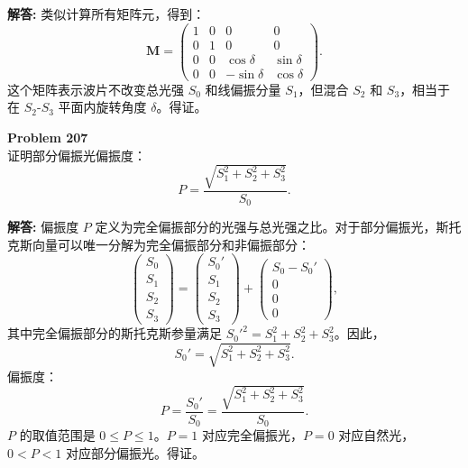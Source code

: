 \documentclass[12pt, a4paper, oneside]{ctexart}
\newenvironment{solution}{\par\noindent\textbf{解答:}\quad}{\par}
\begin{document}
\begin{solution}
    类似计算所有矩阵元，得到：
    \[
    \mathbf{M} = \begin{pmatrix}
        1 & 0 & 0 & 0 \\
        0 & 1 & 0 & 0 \\
        0 & 0 & \cos\delta & \sin\delta \\
        0 & 0 & -\sin\delta & \cos\delta
    \end{pmatrix}.
    \]
    这个矩阵表示波片不改变总光强 $S_0$ 和线偏振分量 $S_1$，但混合 $S_2$ 和 $S_3$，相当于在 $S_2$-$S_3$ 平面内旋转角度 $\delta$。得证。
\end{solution}

\begin{mdframed}[backgroundcolor=gray!10, linewidth=0pt]
    \textbf{Problem 207} \\
    证明部分偏振光偏振度：
    \[
    P = \frac{\sqrt{S_1^2+S_2^2+S_3^2}}{S_0}.
    \]
\end{mdframed}
\begin{solution}
    偏振度 $P$ 定义为完全偏振部分的光强与总光强之比。对于部分偏振光，斯托克斯向量可以唯一分解为完全偏振部分和非偏振部分：
    \[
    \begin{pmatrix} S_0 \\ S_1 \\ S_2 \\ S_3 \end{pmatrix} = \begin{pmatrix} S_0' \\ S_1 \\ S_2 \\ S_3 \end{pmatrix} + \begin{pmatrix} S_0 - S_0' \\ 0 \\ 0 \\ 0 \end{pmatrix},
    \]
    其中完全偏振部分的斯托克斯参量满足 $S_0'^2 = S_1^2 + S_2^2 + S_3^2$。因此，
    \[
    S_0' = \sqrt{S_1^2 + S_2^2 + S_3^2}.
    \]
    偏振度：
    \[
    P = \frac{S_0'}{S_0} = \frac{\sqrt{S_1^2 + S_2^2 + S_3^2}}{S_0}.
    \]
    $P$ 的取值范围是 $0 \le P \le 1$。$P=1$ 对应完全偏振光，$P=0$ 对应自然光，$0 < P < 1$ 对应部分偏振光。得证。
\end{solution}
\end{document}
